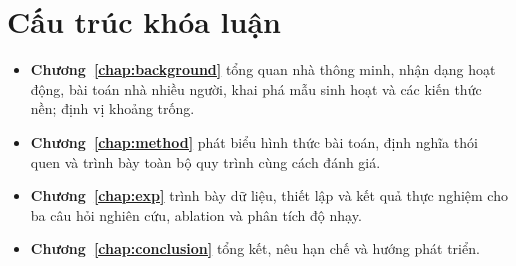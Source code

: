 \section{Cấu trúc khóa luận}

\begin{itemize}
  \item \textbf{Chương~\ref{chap:background}} tổng quan nhà thông minh, nhận dạng hoạt động, bài
  toán nhà nhiều người, khai phá mẫu sinh hoạt và các kiến thức nền; định vị khoảng trống.
  \item \textbf{Chương~\ref{chap:method}} phát biểu hình thức bài toán, định nghĩa thói quen và
  trình bày toàn bộ quy trình cùng cách đánh giá.
  \item \textbf{Chương~\ref{chap:exp}} trình bày dữ liệu, thiết lập và kết quả thực nghiệm cho ba
  câu hỏi nghiên cứu, ablation và phân tích độ nhạy.
  \item \textbf{Chương~\ref{chap:conclusion}} tổng kết, nêu hạn chế và hướng phát triển.
\end{itemize}
